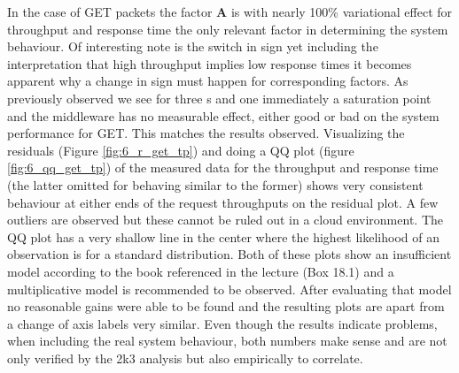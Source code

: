     In the case of GET packets the factor \textbf{A} is with nearly 100\% variational effect for throughput and
    response time the only relevant factor in determining the system behaviour. Of interesting note is the switch in
    sign yet including the interpretation that high throughput implies low response times it becomes apparent why a
    change in sign must happen for corresponding factors. As previously observed we see for three \cli{}s and one
    \srv{} immediately a saturation point and the middleware has no measurable effect, either good or bad on the
    system performance for GET. This matches the results observed. Visualizing the residuals (Figure
    \ref{fig:6_r_get_tp}) and doing a QQ plot (figure \ref{fig:6_qq_get_tp}) of the measured data for the
    throughput and response time (the latter omitted for behaving similar to the former) shows very consistent
    behaviour at either ends of the request throughputs on the residual plot. A few outliers are observed but these
    cannot be ruled out in a cloud environment. The QQ plot has a very shallow line in the center where the highest
    likelihood of an observation is for a standard distribution. Both of these plots show an insufficient model
    according to the book referenced in the lecture (Box 18.1) and a multiplicative model is recommended to be observed.
    After evaluating that model no reasonable gains were able to be found and the resulting plots are apart from a change
    of axis labels very similar. Even though the results indicate problems, when including the real system behaviour,
    both numbers make sense and are not only verified by the 2k3 analysis but also empirically to correlate.

